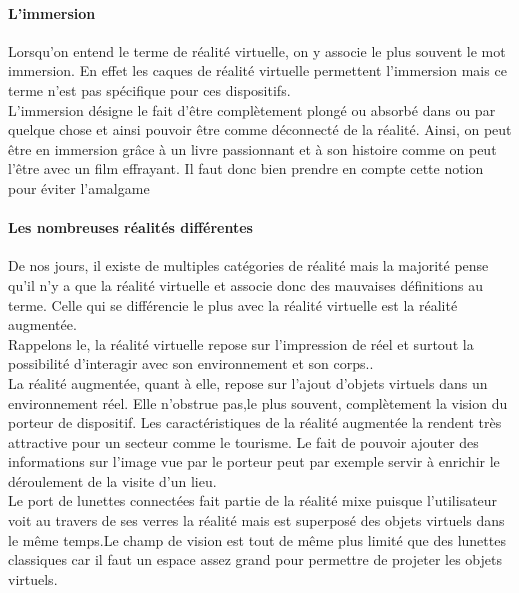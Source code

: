 \documentclass[12pt, a4paper]{report}
\begin{document}
\paragraph{L'immersion}

Lorsqu'on entend le terme de réalité virtuelle, on y associe le plus souvent le mot  immersion. En effet les caques de réalité virtuelle permettent l'immersion mais ce terme n'est pas spécifique pour ces dispositifs. \\L'immersion désigne le fait d'être complètement  plongé ou absorbé dans ou par quelque chose et ainsi pouvoir être comme  déconnecté de la réalité. Ainsi, on peut être en immersion grâce à un livre passionnant et à son histoire comme on peut l'être avec un film effrayant. Il faut donc bien prendre en compte cette notion pour éviter l'amalgame

\paragraph{Les nombreuses réalités différentes}

De nos jours, il existe de multiples catégories de réalité mais la majorité pense qu'il n'y a que la réalité virtuelle et associe donc des mauvaises définitions au terme. Celle qui se différencie le plus avec la réalité virtuelle est la réalité augmentée.\\

Rappelons le, la réalité virtuelle repose sur l'impression de réel et surtout la possibilité d'interagir avec son environnement et son corps..\\
La réalité augmentée, quant à elle, repose sur l'ajout d'objets virtuels dans un environnement réel. Elle n'obstrue pas,le plus souvent, complètement la vision du porteur de dispositif. Les caractéristiques de la réalité augmentée la rendent très attractive pour un secteur comme le tourisme. Le fait de pouvoir ajouter des informations sur l'image vue par le porteur peut par exemple servir à enrichir le déroulement de la visite d'un lieu.\\

Le port de lunettes connectées fait partie de la réalité mixe puisque l'utilisateur voit au travers de ses verres la réalité mais est superposé des objets virtuels dans le même temps.Le champ de vision est tout de même plus limité que des lunettes classiques car il faut un espace assez grand pour permettre de projeter les objets virtuels.\\
\end{document}
